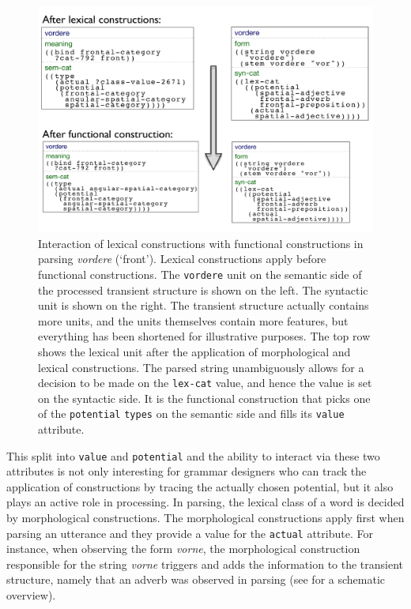 \begin{figure}
\begin{center}
\includegraphics[width=1.0\columnwidth]{figs/parsing-vordere}
\end{center}
\caption[Interaction of lexical constructions
with functional constructions -- semantics]{%
Interaction of lexical constructions 
with functional constructions in parsing \textit{vordere} (`front'). 
Lexical constructions apply before functional constructions.
The {\footnotesize\tt vordere} unit on the semantic side of the 
processed transient structure is shown on the left.
The syntactic unit is shown on the right. The transient 
structure actually contains more units, and the units themselves
contain more features, but everything has been shortened 
for illustrative purposes. The top row shows the lexical unit after the 
application of morphological and lexical constructions. The 
parsed string unambiguously allows for a decision to be 
made on the {\footnotesize\tt lex-cat} value, and 
hence the value is set on the syntactic side. It is the functional 
construction that picks one of the {\footnotesize\tt potential} {\footnotesize\tt types} 
on the semantic side and 
fills its {\footnotesize\tt value} attribute.}
\label{f:parsing-vordere}
\end{figure}

This split into {\footnotesize\tt value} and {\footnotesize\tt potential} and 
the ability to interact via these two attributes is not only interesting
for grammar designers who can track the application
of constructions by tracing the actually chosen potential, but it also plays 
an active role in processing. In parsing,
the lexical class of a word is decided by morphological 
constructions. The morphological constructions apply first when 
parsing an utterance and they provide a value for the
{\footnotesize\tt actual} attribute. For instance, when observing the form 
\textit{vorne}, the morphological construction responsible for the
string \textit{vorne} triggers and adds the information to the transient 
structure, namely that an adverb was observed in parsing (see 
 for a schematic overview).

